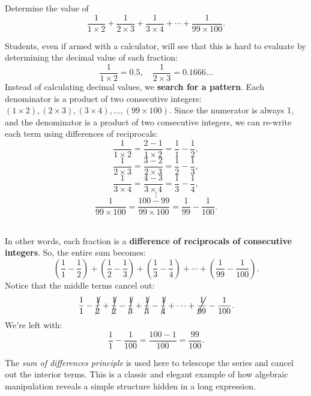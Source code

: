 \documentclass{article}
\begin{document}
\begin{example}\label{example:sum-of-consecutive-reciprocals}
    Determine the value of
    \[
        \frac{1}{1 \times 2} + \frac{1}{2 \times 3} + \frac{1}{3 \times 4} + \cdots + \frac{1}{99 \times 100}.
    \]
      
\end{example}

\begin{analysis*}
    Students, even if armed with a calculator, will see that this is hard to evaluate by determining the decimal value of each fraction:
    \[
        \frac{1}{1 \times 2} = 0.5,\quad \frac{1}{2 \times 3} = 0.1666\ldots
    \]
    Instead of calculating decimal values, we \textbf{search for a pattern}. Each denominator is a product of two consecutive integers: \( (1 \times 2), (2 \times 3), (3 \times 4), \ldots, (99 \times 100) \). 
    Since the numerator is always 1, and the denominator is a product of two consecutive integers, we can re-write each term using differences of reciprocals:
    \[
        \frac{1}{1 \times 2} = \frac{2 - 1}{1 \times 2} = \frac{1}{1} - \frac{1}{2},
    \]
    \[
        \frac{1}{2 \times 3} = \frac{3 - 2}{2 \times 3} = \frac{1}{2} - \frac{1}{3},
    \]
    \[
        \frac{1}{3 \times 4} = \frac{4 - 3}{3 \times 4} = \frac{1}{3} - \frac{1}{4},
    \]
    \[
        \vdots
    \]
    \[
        \frac{1}{99 \times 100} = \frac{100 - 99}{99 \times 100} = \frac{1}{99} - \frac{1}{100}.
    \]
\end{analysis*}

\begin{soln}\ \\\indent
    In other words, each fraction is a \textbf{difference of reciprocals of consecutive integers}.  
    So, the entire sum becomes:
    \[
        \left( \frac{1}{1} - \frac{1}{2} \right) + \left( \frac{1}{2} - \frac{1}{3} \right) + \left( \frac{1}{3} - \frac{1}{4} \right) + \cdots + \left( \frac{1}{99} - \frac{1}{100} \right).
    \]
    Notice that the middle terms cancel out:
    \[
        \frac{1}{1} - \cancel{\frac{1}{2}} + \cancel{\frac{1}{2}} - \cancel{\frac{1}{3}} + \cancel{\frac{1}{3}} - \cancel{\frac{1}{4}} + \cdots + \cancel{\frac{1}{99}} - \frac{1}{100}.
    \]
    We're left with:
    \[
        \frac{1}{1} - \frac{1}{100} = \frac{100 - 1}{100} = \frac{99}{100}.
    \]
\end{soln}

\begin{remark*}
    The \emph{sum of differences principle} is used here to telescope the series and cancel out the interior terms. This is a classic and elegant example of how algebraic manipulation reveals a simple structure hidden in a long expression.
\end{remark*}
\end{document}
